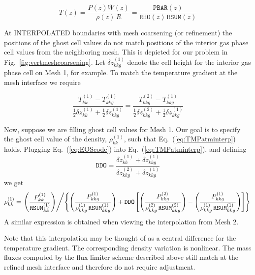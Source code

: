 \begin{equation}
\label{eq:EOScode}
T(z) = \frac{P(z) \overline{W}(z)}{\rho(z) \, R} = \frac{\mathtt{PBAR}(z)}{\mathtt{RHO}(z) \, \mathtt{RSUM}(z)}
\end{equation}

At {\ct INTERPOLATED} boundaries with mesh coarsening (or refinement) the positions of the ghost cell values do not match positions of the interior gas phase cell values from the neighboring mesh.  This is depicted for our problem in Fig.~\ref{fig:vertmeshcoarsening}.  Let $\delta z^{(1)}_{kkg}$ denote the cell height for the interior gas phase cell on Mesh 1, for example.  To match the temperature gradient at the mesh interface we require

\begin{equation}
\label{eq:TMPatminterp}
\frac{T^{(1)}_{kk} - T^{(1)}_{kkg}}{\mbox{$\frac{1}{2}$} \delta z^{(1)}_{kk} + \mbox{$\frac{1}{2}$}\delta z^{(1)}_{kkg}} = \frac{T^{(2)}_{kkg} - T^{(1)}_{kkg}}{\mbox{$\frac{1}{2}$} \delta z^{(2)}_{kkg} + \mbox{$\frac{1}{2}$}\delta z^{(1)}_{kkg}}
\end{equation}

Now, suppose we are filling ghost cell values for Mesh 1.  Our goal is to specify the ghost cell value of the density, $\rho^{(1)}_{kk}$, such that Eq.~(\ref{eq:TMPatminterp}) holds.  Plugging Eq.~(\ref{eq:EOScode}) into Eq.~(\ref{eq:TMPatminterp}), and defining
\begin{equation}
\label{eq:ddofactor}
\mathtt{DDO} = \frac{\delta z^{(1)}_{kk} + \delta z^{(1)}_{kkg}}{\delta z^{(2)}_{kkg} + \delta z^{(1)}_{kkg}}
\end{equation}
we get
\begin{equation}
\label{eq:atmrhoghost}
\rho^{(1)}_{kk} = \left. \left( \frac{P^{(1)}_{kk}}{\mathtt{RSUM}^{(1)}_{kk}} \right) \middle/ \left\{ \left(\frac{P^{(1)}_{kkg}}{\rho^{(1)}_{kkg}\,\mathtt{RSUM}^{(1)}_{kkg}}\right) + \mathtt{DDO}\left[ \left(\frac{P^{(2)}_{kkg}}{\rho^{(2)}_{kkg}\,\mathtt{RSUM}^{(2)}_{kkg}}\right) - \left(\frac{P^{(1)}_{kkg}}{\rho^{(1)}_{kkg}\,\mathtt{RSUM}^{(1)}_{kkg}}\right) \right] \right\} \right.
\end{equation}
A similar expression is obtained when viewing the interpolation from Mesh 2.

Note that this interpolation may be thought of as a central difference for the temperature gradient.  The corresponding density variation is nonlinear.  The mass fluxes computed by the flux limiter scheme described above still match at the refined mesh interface and therefore do not require adjustment.

